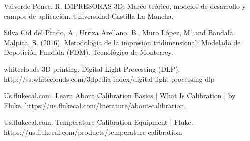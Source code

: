 \begin{thebibliography}{9}
Valverde Ponce, R. IMPRESORAS 3D: Marco teórico, modelos de desarrollo y campos de aplicación. Universidad Castilla-La Mancha. 

Silva Cid del Prado, A., Urriza Arellano, B., Muro López, M. and Bandala Malpica, S. (2016). Metodología de la impresión tridimensional: Modelado de Deposición Fundida (FDM). Tecnológico de Monterrey.

whiteclouds 3D printing. Digital Light Processing (DLP). http://ss.whiteclouds.com/3dpedia-index/digital-light-processing-dlp

Us.flukecal.com. Learn About Calibration Basics | What Is Calibration | by Fluke. https://us.flukecal.com/literature/about-calibration.

Us.flukecal.com. Temperature Calibration Equipment | Fluke. https://us.flukecal.com/products/temperature-calibration.

\end{thebibliography}